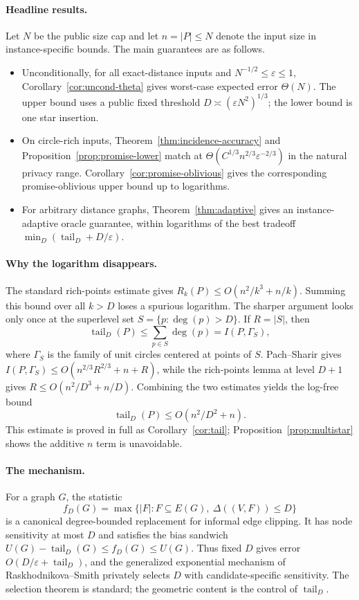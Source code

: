\documentclass[11pt]{article}
\newcommand{\eps}{\varepsilon}
\newcommand{\tail}{\operatorname{tail}}
\begin{document}
\paragraph{Headline results.}
Let \(N\) be the public size cap and let \(n=|P|\le N\) denote the input size in instance-specific bounds. The main guarantees are as follows.
\begin{itemize}[leftmargin=*]
  \item Unconditionally, for all exact-distance inputs and \(N^{-1/2}\le\eps\le1\), Corollary~\ref{cor:uncond-theta} gives worst-case expected error \(\Theta(N)\). The upper bound uses a public fixed threshold \(D\asymp(\eps N^2)^{1/3}\); the lower bound is one star insertion.
  \item On circle-rich inputs, Theorem~\ref{thm:incidence-accuracy} and Proposition~\ref{prop:promise-lower} match at \(\Theta(C^{1/3}n^{2/3}\eps^{-2/3})\) in the natural privacy range. Corollary~\ref{cor:promise-oblivious} gives the corresponding promise-oblivious upper bound up to logarithms.
  \item For arbitrary distance graphs, Theorem~\ref{thm:adaptive} gives an instance-adaptive oracle guarantee, within logarithms of the best tradeoff \(\min_D(\tail_D+D/\eps)\).
\end{itemize}

\paragraph{Why the logarithm disappears.}
The standard rich-points estimate gives \(R_k(P)\le O(n^2/k^3+n/k)\). Summing this bound over all \(k>D\) loses a spurious logarithm. The sharper argument looks only once at the superlevel set \(S=\{p:\deg(p)>D\}\). If \(R=|S|\), then
\[
\tail_D(P)\le\sum_{p\in S}\deg(p)=I(P,\Gamma_S),
\]
where \(\Gamma_S\) is the family of unit circles centered at points of \(S\). Pach--Sharir gives \(I(P,\Gamma_S)\le O(n^{2/3}R^{2/3}+n+R)\), while the rich-points lemma at level \(D+1\) gives \(R\le O(n^2/D^3+n/D)\). Combining the two estimates yields the log-free bound
\[
\tail_D(P)\le O(n^2/D^2+n).
\]
This estimate is proved in full as Corollary~\ref{cor:tail}; Proposition~\ref{prop:multistar} shows the additive \(n\) term is unavoidable.

\paragraph{The mechanism.}
For a graph \(G\), the statistic
\[
 f_D(G)=\max\{|F|:F\subseteq E(G),\ \Delta((V,F))\le D\}
\]
is a canonical degree-bounded replacement for informal edge clipping. It has node sensitivity at most \(D\) and satisfies the bias sandwich \(U(G)-\tail_D(G)\le f_D(G)\le U(G)\). Thus fixed \(D\) gives error \(O(D/\eps+\tail_D)\), and the generalized exponential mechanism of Raskhodnikova--Smith privately selects \(D\) with candidate-specific sensitivity. The selection theorem is standard; the geometric content is the control of \(\tail_D\).
\end{document}
